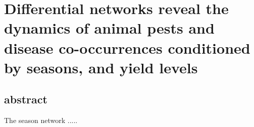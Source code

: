 \section{Differential networks reveal the dynamics of animal pests and disease co-occurrences conditioned by seasons, and yield levels}


\subsection{abstract}
The season network ..... 
